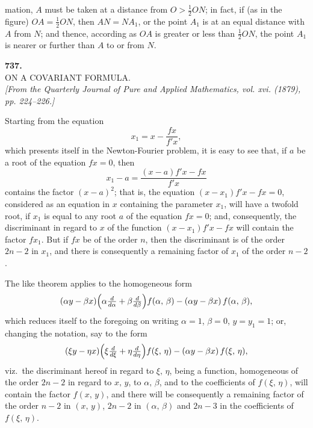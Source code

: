 \documentclass[11pt]{article}
\begin{document}
mation, $A$ must be taken at a distance from $O > \tfrac{1}{2} ON$; in fact, if (as in the figure)
$OA = \tfrac{1}{2} ON$, then $AN = NA_1$, or the point $A_1$ is at an equal distance with $A$ from
$N$; and thence, according as $OA$ is greater or less than $\tfrac{1}{2} ON$, the point $A_1$ is
nearer or further than $A$ to or from $N$.

\bigskip

\begin{center}
\textbf{737.}\\[6pt]
\textsc{ON A COVARIANT FORMULA.}\\[6pt]
\textit{[From the Quarterly Journal of Pure and Applied Mathematics, vol. xvi. (1879),\\
pp. 224--226.]}
\end{center}

\bigskip

\noindent
Starting from the equation
\[
   x_1 = x - \frac{fx}{f'x},
\]
which presents itself in the Newton-Fourier problem, it is easy to see that, if $a$ be
a root of the equation $fx = 0$, then
\[
   x_1 - a = \frac{(x - a)f'x - fx}{f'x}
\]
contains the factor $(x - a)^2$; that is, the equation $(x - x_1)f'x - fx = 0$, considered as an
equation in $x$ containing the parameter $x_1$, will have a twofold root, if $x_1$ is equal
to any root $a$ of the equation $fx = 0$; and, consequently, the discriminant in regard
to $x$ of the function $(x - x_1)f'x - fx$ will contain the factor $fx_1$. But if $fx$ be of the
order $n$, then the discriminant is of the order $2n - 2$ in $x_1$, and there is consequently
a remaining factor of $x_1$ of the order $n - 2$.

The like theorem applies to the homogeneous form
\[
   (\alpha y - \beta x)\Bigl(\alpha \tfrac{d}{d\alpha} + \beta \tfrac{d}{d\beta}\Bigr) f(\alpha,\,\beta) - (\alpha y - \beta x)\,f(\alpha,\,\beta),
\]
which reduces itself to the foregoing on writing $\alpha = 1$, $\beta = 0$, $y = y_1 = 1$; or, changing
the notation, say to the form
\[
   (\xi y - \eta x)\Bigl(\xi \tfrac{d}{d\xi} + \eta \tfrac{d}{d\eta}\Bigr) f(\xi,\,\eta) - (\alpha y - \beta x)\,f(\xi,\,\eta),
\]
viz.\ the discriminant hereof in regard to $\xi,\,\eta$, being a function, homogeneous of the
order $2n - 2$ in regard to $x,\,y$, to $\alpha,\,\beta$, and to the coefficients of $f(\xi,\,\eta)$, will
contain the factor $f(x,\,y)$, and there will be consequently a remaining factor of the
order $n - 2$ in $(x,\,y)$, $2n - 2$ in $(\alpha,\,\beta)$ and $2n - 3$ in the coefficients of $f(\xi,\,\eta)$.
\end{document}
